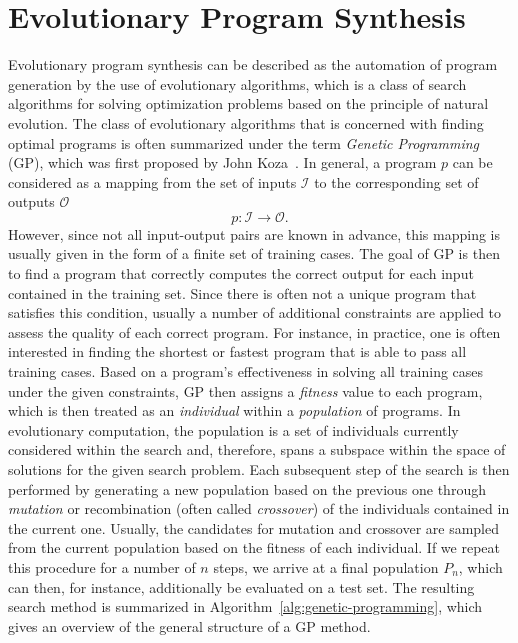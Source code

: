 \section{Evolutionary Program Synthesis}
\label{sec:gggp}
Evolutionary program synthesis can be described as the automation of program generation by the use of evolutionary algorithms, which is a class of search algorithms for solving optimization problems based on the principle of natural evolution.
The class of evolutionary algorithms that is concerned with finding optimal programs is often summarized under the term \emph{Genetic Programming} (GP), which was first proposed by John Koza~\cite{koza1994genetic}.
In general, a program $p$ can be considered as a mapping from the set of inputs $\mathcal{I}$ to the corresponding set of outputs $\mathcal{O}$
\begin{equation}
	p : \mathcal{I} \to \mathcal{O}.
	\label{eq:gp-program}
\end{equation}
However, since not all input-output pairs are known in advance, this mapping is usually given in the form of a finite set of training cases.
The goal of GP is then to find a program that correctly computes the correct output for each input contained in the training set.
Since there is often not a unique program that satisfies this condition, usually a number of additional constraints are applied to assess the quality of each correct program.
For instance, in practice, one is often interested in finding the shortest or fastest program that is able to pass all training cases.
Based on a program's effectiveness in solving all training cases under the given constraints, GP then assigns a \emph{fitness} value to each program, which is then treated as an \emph{individual} within a \emph{population} of programs.
In evolutionary computation, the population is a set of individuals currently considered within the search and, therefore, spans a subspace within the space of solutions for the given search problem.
Each subsequent step of the search is then performed by generating a new population based on the previous one through \emph{mutation} or recombination (often called \emph{crossover}) of the individuals contained in the current one.
Usually, the candidates for mutation and crossover are sampled from the current population based on the fitness of each individual.
If we repeat this procedure for a number of $n$ steps, we arrive at a final population $P_n$, which can then, for instance, additionally be evaluated on a test set.
The resulting search method is summarized in Algorithm~\ref{alg:genetic-programming}, which gives an overview of the general structure of a GP method.
